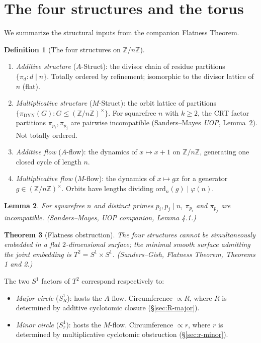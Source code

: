\documentclass[11pt,reqno]{amsart}
\theoremstyle{plain}
\newtheorem{theorem}{Theorem}
\newtheorem{lemma}[theorem]{Lemma}
\theoremstyle{definition}
\newtheorem{definition}[theorem]{Definition}
\newcommand{\Z}{\mathbb{Z}}
\newcommand{\Zn}{\Z/n\Z}
\newcommand{\Zns}{(\Z/n\Z)^{\times}}
\newcommand{\DYN}{\mathrm{DYN}}
\newcommand{\ord}{\mathrm{ord}}
\begin{document}
\section{The four structures and the torus} \label{sec:torus}

We summarize the structural inputs from the companion Flatness Theorem.

\begin{definition}[The four structures on $\Zn$] \label{def:four-structures}
\begin{enumerate}[label=(\arabic*)]
\item \emph{Additive structure} ($A$-Struct): the divisor chain of residue partitions $\{\pi_d : d \mid n\}$. Totally ordered by refinement; isomorphic to the divisor lattice of $n$ (flat).
\item \emph{Multiplicative structure} ($M$-Struct): the orbit lattice of partitions $\{\pi_{\DYN}(G) : G \leq \Zns\}$. For squarefree $n$ with $k \geq 2$, the CRT factor partitions $\pi_{p_i}, \pi_{p_j}$ are pairwise incompatible (Sanders--Mayes \emph{UOP}, Lemma~\ref{lem:pwise-incomp-cite}). Not totally ordered.
\item \emph{Additive flow} ($A$-flow): the dynamics of $x \mapsto x + 1$ on $\Zn$, generating one closed cycle of length $n$.
\item \emph{Multiplicative flow} ($M$-flow): the dynamics of $x \mapsto g x$ for a generator $g \in \Zns$. Orbits have lengths dividing $\ord_n(g) \mid \varphi(n)$.
\end{enumerate}
\end{definition}

\begin{lemma} \label{lem:pwise-incomp-cite}
For squarefree $n$ and distinct primes $p_i, p_j \mid n$, $\pi_{p_i}$ and $\pi_{p_j}$ are incompatible. \emph{(Sanders--Mayes, UOP companion, Lemma 4.1.)}
\end{lemma}

\begin{theorem}[Flatness obstruction]\label{thm:flatness-cite}
The four structures cannot be simultaneously embedded in a flat $2$-dimensional surface; the minimal smooth surface admitting the joint embedding is $T^2 = S^1 \times S^1$. \emph{(Sanders--Gish, Flatness Theorem, Theorems 1 and 2.)}
\end{theorem}

The two $S^1$ factors of $T^2$ correspond respectively to:
\begin{itemize}
\item \emph{Major circle} ($S^1_R$): hosts the $A$-flow. Circumference $\propto R$, where $R$ is determined by additive cyclotomic closure (\S\ref{sec:R-major}).
\item \emph{Minor circle} ($S^1_r$): hosts the $M$-flow. Circumference $\propto r$, where $r$ is determined by multiplicative cyclotomic obstruction (\S\ref{sec:r-minor}).
\end{itemize}
\end{document}
